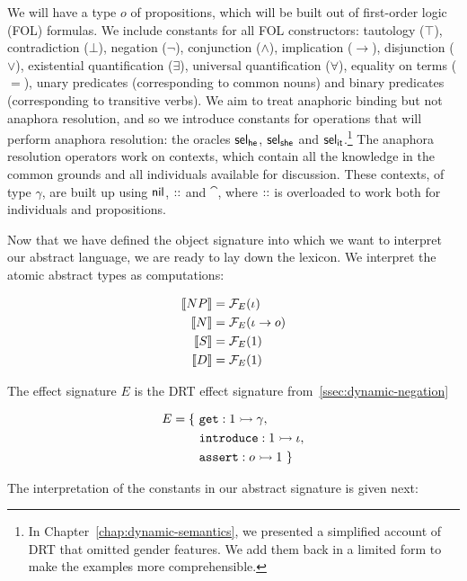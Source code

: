 We will have a type $o$ of propositions, which will be built out of
first-order logic (FOL) formulas. We include constants for all FOL
constructors: tautology ($\top$), contradiction ($\bot$), negation
($\lnot$), conjunction ($\land$), implication ($\to$), disjunction
($\lor$), existential quantification ($\exists$), universal quantification
($\forall$), equality on terms ($=$), unary predicates (corresponding to
common nouns) and binary predicates (corresponding to transitive verbs). We
aim to treat anaphoric binding but not anaphora resolution, and so we
introduce constants for operations that will perform anaphora resolution:
the oracles $\textsf{sel}_{\textsf{he}}$, $\textsf{sel}_{\textsf{she}}$ and $\textsf{sel}_{\textsf{it}}$.\footnote{In
  Chapter~\ref{chap:dynamic-semantics}, we presented a simplified account
  of DRT that omitted gender features. We add them back in a limited form
  to make the examples more comprehensible.} The anaphora resolution
operators work on contexts, which contain all the knowledge in the common
grounds and all individuals available for discussion. These contexts, of
type $\gamma$, are built up using $\textsf{nil}$, $\mathbin{::}$ and $\cat$, where $\mathbin{::}$
is overloaded to work both for individuals and propositions.

Now that we have defined the object signature into which we want to
interpret our abstract language, we are ready to lay down the
lexicon. We interpret the atomic abstract types as computations:

\begin{align*}
  \llbracket NP \rrbracket &= \mathcal{F}_E(\iota) \\
  \llbracket N \rrbracket &= \mathcal{F}_E(\iota \to o) \\
  \llbracket S \rrbracket &= \mathcal{F}_E(1) \\
  \llbracket D \rrbracket &= \mathcal{F}_E(1)
\end{align*}

The effect signature $E$ is the DRT effect signature
from~\ref{ssec:dynamic-negation}

\begin{align*}
  E = \{\ &\mathtt{get} : 1 \rightarrowtail \gamma, \\
          &\mathtt{introduce} : 1 \rightarrowtail \iota, \\
          &\mathtt{assert} : o \rightarrowtail 1\ \}
\end{align*}

The interpretation of the constants in our abstract signature is given
next:

